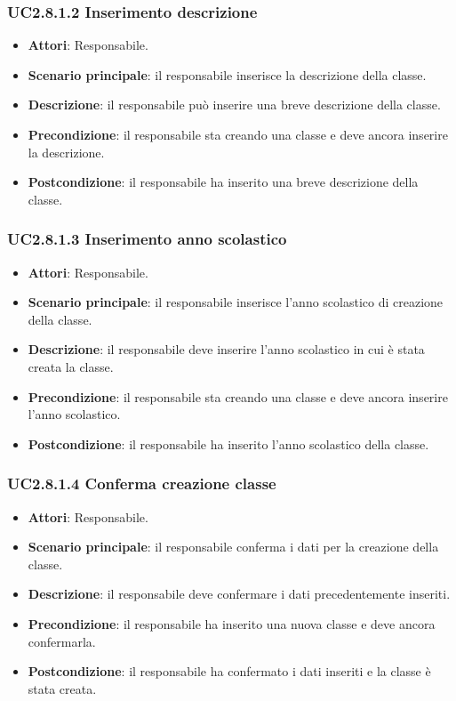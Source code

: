 \subsubsection{UC2.8.1.2 Inserimento descrizione}
\begin{itemize}
\item \textbf{Attori}: Responsabile.
\item \textbf{Scenario principale}: il responsabile inserisce la descrizione della classe.
\item \textbf{Descrizione}: il responsabile può inserire una breve descrizione della classe.
\item \textbf{Precondizione}: il responsabile sta creando una classe e deve ancora inserire la descrizione.
\item \textbf{Postcondizione}: il responsabile ha inserito una breve descrizione della classe.
\end{itemize}
\subsubsection{UC2.8.1.3 Inserimento anno scolastico}
\begin{itemize}
\item \textbf{Attori}: Responsabile.
\item \textbf{Scenario principale}: il responsabile inserisce l'anno scolastico di creazione della classe.
\item \textbf{Descrizione}: il responsabile deve inserire l'anno scolastico in cui è stata creata la classe.
\item \textbf{Precondizione}: il responsabile sta creando una classe e deve ancora inserire l'anno scolastico.
\item \textbf{Postcondizione}: il responsabile ha inserito l'anno scolastico della classe.
\end{itemize}
\subsubsection{UC2.8.1.4 Conferma creazione classe}
\begin{itemize}
\item \textbf{Attori}: Responsabile.
\item \textbf{Scenario principale}: il responsabile conferma i dati per la creazione della classe.
\item \textbf{Descrizione}: il responsabile deve confermare i dati precedentemente inseriti.
\item \textbf{Precondizione}: il responsabile ha inserito una nuova classe e deve ancora confermarla.
\item \textbf{Postcondizione}: il responsabile ha confermato i dati inseriti e la classe è stata creata.
\end{itemize}
